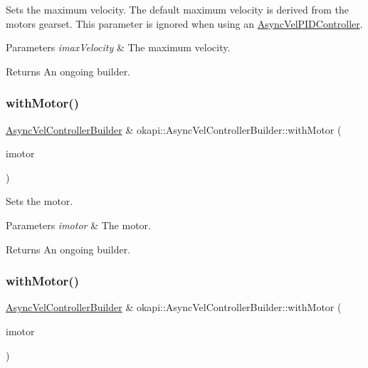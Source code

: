 Sets the maximum velocity. The default maximum velocity is derived from the motor\textquotesingle{}s gearset. This parameter is ignored when using an \mbox{\hyperlink{classokapi_1_1AsyncVelPIDController}{Async\+Vel\+P\+I\+D\+Controller}}.


\begin{DoxyParams}{Parameters}
{\em imax\+Velocity} & The maximum velocity. \\
\hline
\end{DoxyParams}
\begin{DoxyReturn}{Returns}
An ongoing builder. 
\end{DoxyReturn}
\mbox{\label{classokapi_1_1AsyncVelControllerBuilder_a64b047406f6aa211691f99b2da80fd29}} 
\subsubsection{\texorpdfstring{withMotor()}{withMotor()}\hspace{0.1cm}{\footnotesize\ttfamily [1/3]}}
{\footnotesize\ttfamily \mbox{\hyperlink{classokapi_1_1AsyncVelControllerBuilder}{Async\+Vel\+Controller\+Builder}} \& okapi\+::\+Async\+Vel\+Controller\+Builder\+::with\+Motor (\begin{DoxyParamCaption}\item[{const \mbox{\hyperlink{classokapi_1_1Motor}{Motor}} \&}]{imotor }\end{DoxyParamCaption})}

Sets the motor.


\begin{DoxyParams}{Parameters}
{\em imotor} & The motor. \\
\hline
\end{DoxyParams}
\begin{DoxyReturn}{Returns}
An ongoing builder. 
\end{DoxyReturn}
\mbox{\label{classokapi_1_1AsyncVelControllerBuilder_a8c818cb67b99b64722df86a1e391c7da}} 
\subsubsection{\texorpdfstring{withMotor()}{withMotor()}\hspace{0.1cm}{\footnotesize\ttfamily [2/3]}}
{\footnotesize\ttfamily \mbox{\hyperlink{classokapi_1_1AsyncVelControllerBuilder}{Async\+Vel\+Controller\+Builder}} \& okapi\+::\+Async\+Vel\+Controller\+Builder\+::with\+Motor (\begin{DoxyParamCaption}\item[{const \mbox{\hyperlink{classokapi_1_1MotorGroup}{Motor\+Group}} \&}]{imotor }\end{DoxyParamCaption})}


